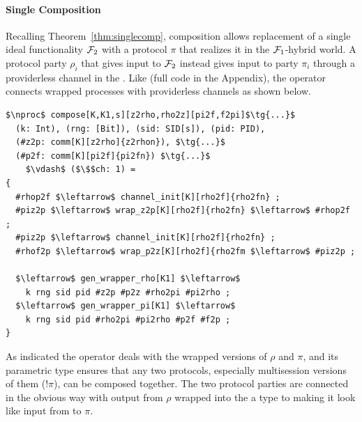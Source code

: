 \paragraph*{\textbf{Single Composition}}
Recalling Theorem~\ref{thm:singlecomp}, composition allows replacement of a single ideal functionality $\mathcal{F}_2$ with a protocol $\pi$ that realizes it in the $\mathcal{F}_1$-hybrid world. 
A protocol party $\rho_i$ that gives input to $\mathcal{F}_2$ instead gives input to party $\pi_i$ through a providerless channel in the \partywrapper. 
Like  (full code in the Appendix), the operator connects wrapped processes with providerless channels as shown below. 

\begin{lstlisting}[basicstyle=\footnotesize\BeraMonottFamily, mathescape, frame=single]
$\nproc$ compose[K,K1,s][z2rho,rho2z][pi2f,f2pi]$\tg{...}$
  (k: Int), (rng: [Bit]), (sid: SID[s]), (pid: PID),
  (#z2p: comm[K][z2rho]{z2rhon}), $\tg{...}$ 
  (#p2f: comm[K][pi2f]{pi2fn}) $\tg{...}$
    $\vdash$ ($\$$ch: 1) =
{
  #rhop2f $\leftarrow$ channel_init[K][rho2f]{rho2fn} ;
  #piz2p $\leftarrow$ wrap_z2p[K][rho2f]{rho2fn} $\leftarrow$ #rhop2f ;
  #piz2p $\leftarrow$ channel_init[K][rho2f]{rho2fn} ;
  #rhof2p $\leftarrow$ wrap_p2z[K][rho2f]{rho2fm $\leftarrow$ #piz2p ;

  $\leftarrow$ gen_wrapper_rho[K1] $\leftarrow$ 
    k rng sid pid #z2p #p2z #rho2pi #pi2rho ;
  $\leftarrow$ gen_wrapper_pi[K1] $\leftarrow$ 
    k rng sid pid #rho2pi #pi2rho #p2f #f2p ; 
}
\end{lstlisting}
As indicated the operator deals with the wrapped versions of $\rho$ and $\pi$, and its parametric type ensures that any two protocols, especially multisession versions of them ($!\pi$), can be composed together.
The two protocol parties are connected in the obvious way with output from $\rho$ wrapped into the a type  to making it look like input from \Z to $\pi$.

%

